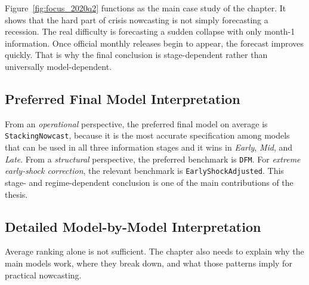 \documentclass[12pt,a4paper]{report}
\begin{document}
Figure~\ref{fig:focus_2020q2} functions as the main case study of the chapter. It shows that the hard part of crisis nowcasting is not simply forecasting a recession. The real difficulty is forecasting a sudden collapse with only month-1 information. Once official monthly releases begin to appear, the forecast improves quickly. That is why the final conclusion is stage-dependent rather than universally model-dependent.

\subsection{Preferred Final Model Interpretation}

From an \textit{operational} perspective, the preferred final model on average is \texttt{StackingNowcast}, because it is the most accurate specification among models that can be used in all three information stages and it wins in \textit{Early}, \textit{Mid}, and \textit{Late}. From a \textit{structural} perspective, the preferred benchmark is \texttt{DFM}. For \textit{extreme early-shock correction}, the relevant benchmark is \texttt{EarlyShockAdjusted}. This stage- and regime-dependent conclusion is one of the main contributions of the thesis.

\subsection{Detailed Model-by-Model Interpretation}

Average ranking alone is not sufficient. The chapter also needs to explain why the main models work, where they break down, and what those patterns imply for practical nowcasting.
\end{document}
